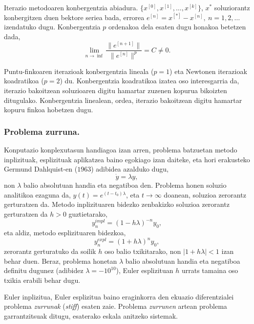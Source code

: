 Iterazio metodoaren konbergentzia abiadura. $\{x^{[0]},x^{[1]},\dots,x^{[k]}\}$, $x^{\ast}$ soluziorantz konbergitzen duen bektore seriea bada, errorea $e^{[n]}=x^{[*]}-x^{[n]}, \ n=1,2,\dots$ izendatuko dugu. Konbergentzia $p$ ordenakoa dela esaten dugu honakoa betetzen dada,
\begin{equation*}
\lim\limits_{n\rightarrow \inf} \frac{\|e^{[n+1]}\|}{\|e^{[n]}\|^p}= C \ne 0.
\end{equation*}

Puntu-finkoaren iterazioak konbergentzia lineala ($p=1$) eta Newtonen iterazioak koadratikoa ($p=2$) du. Konbergentzia koadratikoa izatea oso interesgarria da, iterazio bakoitzean soluzioaren digitu hamartar zuzenen kopurua bikoizten ditugulako. Konbergentzia linealean, ordea, iterazio bakoitzean digitu hamartar kopuru finkoa hobetzen dugu. 
  
\subsubsection*{Problema zurruna.}

Konputazio konplexutasun handiagoa izan arren, problema batzuetan metodo inplizituak, esplizituak aplikatzea baino egokiago izan daiteke, eta hori erakusteko Germund Dahlquist-en ($1963$) adibidea azalduko dugu,
\begin{equation}
 \label{eq:202c}
\dot y=\lambda y,
\end{equation} 
non $\lambda$ balio absolutuan handia eta negatiboa den. Problema honen soluzio analitikoa ezaguna da, $y(t)=e^{(t-t_0)\lambda}$, eta $t \rightarrow \infty$ doanean, soluzioa zerorantz gerturatzen da. Metodo inplizituaren bidezko zenbakizko soluzioa zerorantz gerturatzen da $h>0$ guztietarako,
\begin{equation*}
y_n^{impl}=(1-h\lambda)^{-n} y_0,
\end{equation*}    
eta aldiz, metodo esplizituaren bidezkoa,
\begin{equation*}
y_n^{expl}=(1+h\lambda)^{n} y_0,
\end{equation*}    
zerorantz gerturatuko da soilik $h$ oso balio txikitarako, non $|1+h\lambda|<1$ izan behar duen. Beraz, problema honetan $\lambda$ balio absolutuan handia  eta negatiboa definitu dugunez (adibidez $\lambda=-10^{10}$), Euler esplizituan $h$ urrats tamaina oso txikia erabili behar dugu.    

Euler inplizitua, Euler esplizitua baino eraginkorra den ekuazio diferentzialei problema \emph{zurrunak} (\emph{stiff}) esaten zaie. Problema \emph{zurrunen} artean problema garrantzitsuak ditugu, esaterako eskala anitzeko sistemak. 

